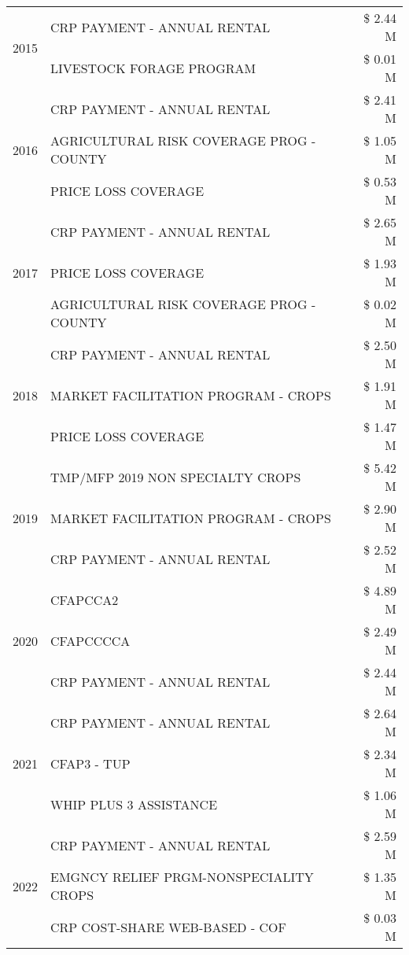 \begin{tabular}{llr}
\multirow[t]{2}{*}{2015} & CRP PAYMENT - ANNUAL RENTAL & \$ 2.44 M \\
 & LIVESTOCK FORAGE PROGRAM & \$ 0.01 M \\
\cline{1-3}
\multirow[t]{3}{*}{2016} & CRP PAYMENT - ANNUAL RENTAL & \$ 2.41 M \\
 & AGRICULTURAL RISK COVERAGE PROG - COUNTY & \$ 1.05 M \\
 & PRICE LOSS COVERAGE & \$ 0.53 M \\
\cline{1-3}
\multirow[t]{3}{*}{2017} & CRP PAYMENT - ANNUAL RENTAL & \$ 2.65 M \\
 & PRICE LOSS COVERAGE & \$ 1.93 M \\
 & AGRICULTURAL RISK COVERAGE PROG - COUNTY & \$ 0.02 M \\
\cline{1-3}
\multirow[t]{3}{*}{2018} & CRP PAYMENT - ANNUAL RENTAL & \$ 2.50 M \\
 & MARKET FACILITATION PROGRAM - CROPS & \$ 1.91 M \\
 & PRICE LOSS COVERAGE & \$ 1.47 M \\
\cline{1-3}
\multirow[t]{3}{*}{2019} & TMP/MFP 2019 NON SPECIALTY CROPS & \$ 5.42 M \\
 & MARKET FACILITATION PROGRAM - CROPS & \$ 2.90 M \\
 & CRP PAYMENT - ANNUAL RENTAL & \$ 2.52 M \\
\cline{1-3}
\multirow[t]{3}{*}{2020} & CFAPCCA2 & \$ 4.89 M \\
 & CFAPCCCCA & \$ 2.49 M \\
 & CRP PAYMENT - ANNUAL RENTAL & \$ 2.44 M \\
\cline{1-3}
\multirow[t]{3}{*}{2021} & CRP PAYMENT - ANNUAL RENTAL & \$ 2.64 M \\
 & CFAP3 - TUP & \$ 2.34 M \\
 & WHIP PLUS 3 ASSISTANCE & \$ 1.06 M \\
\cline{1-3}
\multirow[t]{3}{*}{2022} & CRP PAYMENT - ANNUAL RENTAL & \$ 2.59 M \\
 & EMGNCY RELIEF PRGM-NONSPECIALITY CROPS & \$ 1.35 M \\
 & CRP COST-SHARE WEB-BASED - COF & \$ 0.03 M \\
\cline{1-3}
\bottomrule
\end{tabular}

